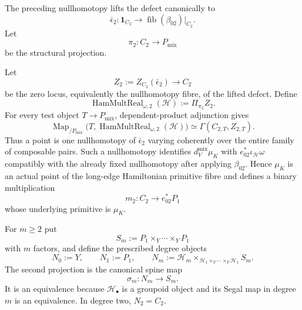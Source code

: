 The preceding nullhomotopy lifts the defect canonically to
\[
\bar\epsilon_2:
\mathbf1_{C_2}
\longrightarrow
\operatorname{fib}(\beta_{02})|_{C_2}.
\]
Let
\[
\pi_2:C_2\longrightarrow P_{\mathrm{mix}}
\]
be the structural projection.

\begin{construction}
\label{constr:prequantum-composition-hamiltonian-primitives}
Let
\[
Z_2:=Z_{C_2}(\bar\epsilon_2)\longrightarrow C_2
\]
be the zero locus, equivalently the nullhomotopy fibre, of the lifted defect.
Define
\[
\boxed{
\operatorname{HamMultReal}_{\omega,2}(\mathcal H)
:=
\Pi_{\pi_2}Z_2.
}
\]
For every test object $T\to P_{\mathrm{mix}}$, dependent-product adjunction
gives
\[
\operatorname{Map}_{/P_{\mathrm{mix}}}
\bigl(T,\operatorname{HamMultReal}_{\omega,2}(\mathcal H)\bigr)
\simeq
\Gamma(C_{2,T},Z_{2,T}).
\]
Thus a point is one nullhomotopy of $\bar\epsilon_2$ varying coherently over the
entire family of composable pairs.  Such a nullhomotopy identifies
$d_V^{\mathrm{mix}}\mu_K$ with $e_{02}^*\iota_{\mathcal H}\omega$ compatibly
with the already fixed nullhomotopy after applying $\beta_{02}$.  Hence $\mu_K$
is an actual point of the long-edge Hamiltonian primitive fibre and defines a
binary multiplication
\[
m_2:C_2\longrightarrow e_{02}^*P_1
\]
whose underlying primitive is $\mu_K$.
\end{construction}

For $m\ge2$ put
\[
S_m:=P_1\times_Y\cdots\times_YP_1
\]
with $m$ factors, and define the prescribed degree objects
\[
\boxed{
N_0:=Y,
\qquad
N_1:=P_1,
\qquad
N_m:=\mathcal H_m
\times_{\mathcal H_1\times_Y\cdots\times_Y\mathcal H_1}S_m.
}
\]
The second projection is the canonical spine map
\[
\sigma_m:N_m\longrightarrow S_m.
\]
It is an equivalence because $\mathcal H_\bullet$ is a groupoid object and its
Segal map in degree $m$ is an equivalence.  In degree two, $N_2=C_2$.

